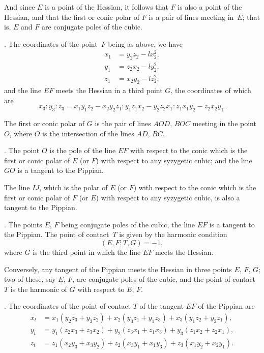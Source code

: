 \documentclass[11pt,a4paper]{book}
\begin{document}
\begin{center}
And since $E$ is a point of the Hessian, it follows that $F$ is
also a point of the Hessian, and that the first or conic polar
of $F$ is a pair of lines meeting in~$E$; that is, $E$ and $F$ are
conjugate poles of the cubic.

. The coordinates of the point~$F$ being as above, we have
\begin{align*}
x_{1} &= y_{2}z_{2} - lx_{2}^{2}, \\
y_{1} &= z_{2}x_{2} - ly_{2}^{2}, \\
z_{1} &= x_{2}y_{2} - lz_{2}^{2},
\end{align*}
and the line $EF$ meets the Hessian in a third point $G$, the
coordinates of which are
\[
x_{3} : y_{3} : z_{3} = x_{1}y_{1}z_{2} - x_{2}y_{2}z_{1}
: y_{1}z_{1}x_{2} - y_{2}z_{2}x_{1}
: z_{1}x_{1}y_{2} - z_{2}x_{2}y_{1}.
\]

The first or conic polar of $G$ is the pair of lines $AOD$, $BOC$
meeting in the point $O$, where $O$ is the intersection of the
lines $AD$, $BC$.

. The point $O$ is the pole of the line $EF$ with respect to
the conic which is the first or conic polar of $E$ (or $F$) with
respect to any syzygetic cubic; and the line $GO$ is a tangent
to the Pippian.

The line $IJ$, which is the polar of $E$ (or $F$) with respect
to the conic which is the first or conic polar of $F$ (or $E$)
with respect to any syzygetic cubic, is also a tangent to the
Pippian.

. The points $E$, $F$ being conjugate poles of the cubic,
the line $EF$ is a tangent to the Pippian. The point of contact~$T$
is given by the harmonic condition
\[
(E, F; T, G) = -1,
\]
where $G$ is the third point in which the line $EF$ meets the Hessian.

Conversely, any tangent of the Pippian meets the Hessian
in three points $E$, $F$, $G$; two of these, say $E$, $F$, are
conjugate poles of the cubic, and the point of contact $T$ is
the harmonic of $G$ with respect to $E$, $F$.

. The coordinates of the point of contact $T$ of the tangent
$EF$ of the Pippian are
\begin{align*}
x_{t} &= x_{1}(y_{2}z_{3} + y_{3}z_{2}) + x_{2}(y_{3}z_{1} + y_{1}z_{3})
+ x_{3}(y_{1}z_{2} + y_{2}z_{1}), \\
y_{t} &= y_{1}(z_{2}x_{3} + z_{3}x_{2}) + y_{2}(z_{3}x_{1} + z_{1}x_{3})
+ y_{3}(z_{1}x_{2} + z_{2}x_{1}), \\
z_{t} &= z_{1}(x_{2}y_{3} + x_{3}y_{2}) + z_{2}(x_{3}y_{1} + x_{1}y_{3})
+ z_{3}(x_{1}y_{2} + x_{2}y_{1}).
\end{align*}


\end{center}
\end{document}

